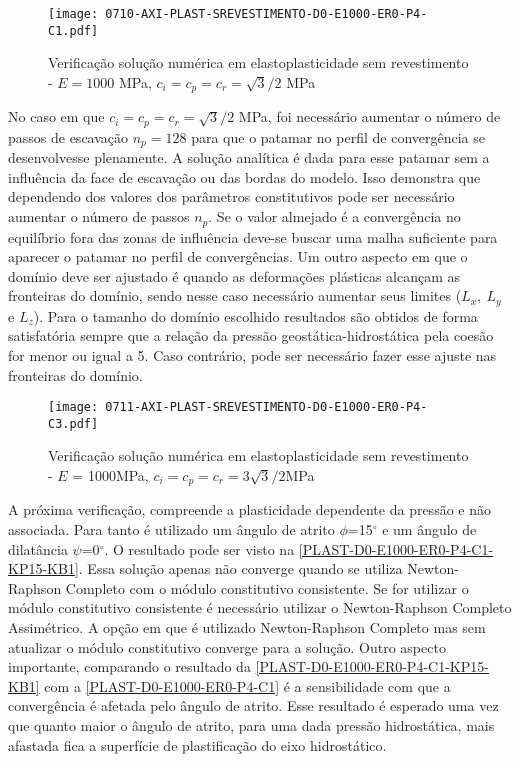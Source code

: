 \begin{figure}[H]
	\begin{center}
		\texttt{[image: 0710-AXI-PLAST-SREVESTIMENTO-D0-E1000-ER0-P4-C1.pdf]}
	\end{center}
	\caption{\label{PLAST-D0-E1000-ER0-P4-C1}Verificação solução numérica em elastoplasticidade sem revestimento - $E = 1000$ MPa,  $c_i=c_p=c_r = \sqrt{3}/2$ MPa}
\end{figure}
No caso em que $c_i=c_p=c_r = \sqrt{3}/2$ MPa, foi necessário aumentar o número de passos de escavação $n_p = 128$ para que o patamar no perfil de convergência se desenvolvesse plenamente. A solução analítica é dada para esse patamar sem a influência da face de escavação ou das bordas do modelo. Isso demonstra que dependendo dos valores dos parâmetros constitutivos pode ser necessário aumentar o número de passos $n_p$. Se o valor almejado é a convergência no equilíbrio fora das zonas de influência deve-se buscar uma malha suficiente para aparecer o patamar no perfil de convergências. Um outro aspecto em que o domínio deve ser ajustado é quando as deformações plásticas alcançam as fronteiras do domínio, sendo nesse caso necessário aumentar seus limites ($L_x,~L_y$ e $L_z$). Para o tamanho do domínio escolhido resultados são obtidos de forma satisfatória sempre que a relação da pressão geostática-hidrostática pela coesão for menor ou igual a 5. Caso contrário, pode ser necessário fazer esse ajuste nas fronteiras do domínio.
\begin{figure}[H]
	\begin{center}
		\texttt{[image: 0711-AXI-PLAST-SREVESTIMENTO-D0-E1000-ER0-P4-C3.pdf]}
	\end{center}
	\caption{\label{PLAST-D0-E1000-ER0-P4-C3}Verificação solução numérica em elastoplasticidade sem revestimento - $E$ = 1000MPa, $c_i=c_p=c_r = 3\sqrt{3}/2$MPa}
\end{figure}
 A próxima verificação, compreende a plasticidade dependente da pressão e não associada. Para tanto é utilizado um ângulo de atrito $\phi$=15$^\circ$ e um ângulo de dilatância $\psi$=0$^\circ$. O resultado pode ser visto na \autoref{PLAST-D0-E1000-ER0-P4-C1-KP15-KB1}. Essa solução apenas não converge quando se utiliza Newton-Raphson Completo com o módulo constitutivo consistente. Se for utilizar o módulo constitutivo consistente é necessário utilizar o Newton-Raphson Completo Assimétrico. A opção em que é utilizado Newton-Raphson Completo mas sem atualizar o módulo constitutivo converge para a solução. Outro aspecto importante, comparando o resultado da \autoref{PLAST-D0-E1000-ER0-P4-C1-KP15-KB1} com a \autoref{PLAST-D0-E1000-ER0-P4-C1} é a sensibilidade com que a convergência é afetada pelo ângulo de atrito. Esse resultado é esperado uma vez que quanto maior o ângulo de atrito, para uma dada pressão hidrostática, mais afastada fica a superfície de plastificação do eixo hidrostático.
